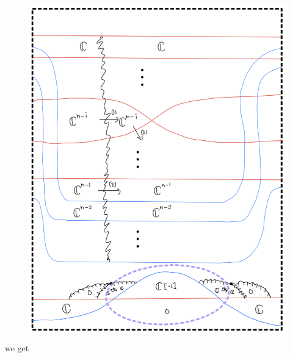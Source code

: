 \begin{enumerate}[label = (\roman*)]
\begin{enumerate}[label = (Case \arabic*)]
\begin{enumerate}[label = (Step \arabic*)]
\begin{figure}[H]
    \centering
    \includegraphics[scale = 0.95]{diagrams/cobord_gen/4.png}
    \caption{}
    \label{fig:your-label}
\end{figure}

we get


\end{enumerate}
\end{enumerate}
\end{enumerate}
